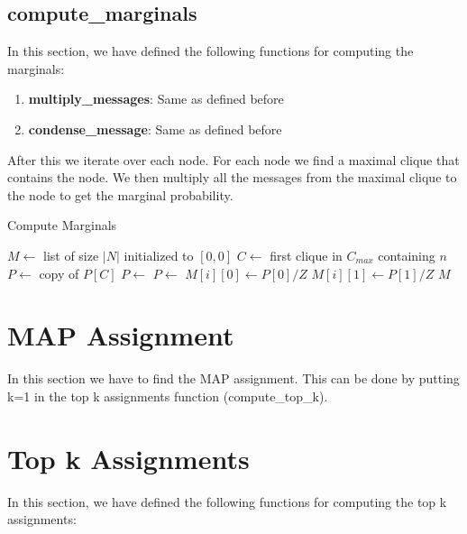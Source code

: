 \documentclass[12pt]{article}
\begin{document}
\subsection{compute\_marginals}
In this section, we have defined the following functions for computing the marginals:

\begin{enumerate}
    \item \textbf{multiply\_messages}: Same as defined before
    \item \textbf{condense\_message}: Same as defined before
\end{enumerate}

After this we iterate over each node. For each node we find a maximal clique that contains the node. We then multiply all the messages from the maximal clique to the node to get the marginal probability.

\begin{algorithm}
    \caption{Compute Marginals}
    \begin{algorithmic}[1]
    \State $M \gets$ list of size $|N|$ initialized to $[0,0]$
        \State $C \gets$ first clique in $C_{max}$ containing $n$
        \State $P \gets$ copy of $P[C]$
            \State $P \gets$ 
        \EndFor
        \State $P \gets$ 
        \State $M[i][0] \gets P[0] / Z$
        \State $M[i][1] \gets P[1] / Z$
    \EndFor
    \State \Return $M$
    \end{algorithmic}
\end{algorithm}

\section{MAP Assignment}

In this section we have to find the MAP assignment. This can be done by putting k=1 in the top k assignments function (compute\_top\_k).

\newpage

\section{Top k Assignments}

In this section, we have defined the following functions for computing the top k assignments:
\end{document}
